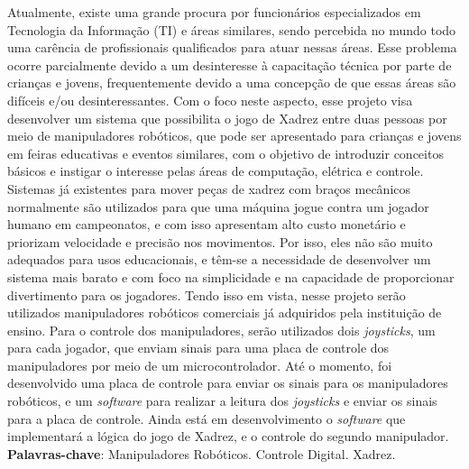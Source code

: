

\setlength{\absparsep}{18pt} %
\begin{resumo}
  Atualmente, existe uma grande procura por funcionários especializados em Tecnologia da Informação (TI) e áreas similares, sendo percebida no mundo todo uma carência de profissionais qualificados para atuar nessas áreas.
  Esse problema ocorre parcialmente devido a um desinteresse à capacitação técnica por parte de crianças e jovens, frequentemente devido a uma concepção de que essas áreas são difíceis e/ou desinteressantes.
  Com o foco neste aspecto, esse projeto visa desenvolver um sistema que possibilita o jogo de Xadrez entre duas pessoas por meio de manipuladores robóticos, que pode ser apresentado para crianças e jovens em feiras educativas e eventos similares, com o objetivo de introduzir conceitos básicos e instigar o interesse pelas áreas de computação, elétrica e controle.
  Sistemas já existentes para mover peças de xadrez com braços mecânicos normalmente são utilizados para que uma máquina jogue contra um jogador humano em campeonatos, e com isso apresentam alto custo monetário e priorizam velocidade e precisão nos movimentos.
  Por isso, eles não são muito adequados para usos educacionais, e têm-se a necessidade de desenvolver um sistema mais barato e com foco na simplicidade e na capacidade de proporcionar divertimento para os jogadores.
  Tendo isso em vista, nesse projeto serão utilizados manipuladores robóticos comerciais já adquiridos pela instituição de ensino.
  Para o controle dos manipuladores, serão utilizados dois \textit{joysticks}, um para cada jogador, que enviam sinais para uma placa de controle dos manipuladores por meio de um microcontrolador.
  Até o momento, foi desenvolvido uma placa de controle para enviar os sinais para os manipuladores robóticos, e um \textit{software} para realizar a leitura dos \textit{joysticks} e enviar os sinais para a placa de controle.
  Ainda está em desenvolvimento o \textit{software} que implementará a lógica do jogo de Xadrez, e o controle do segundo manipulador.
 \textbf{Palavras-chave}: Manipuladores Robóticos. Controle Digital. Xadrez.
\end{resumo}


